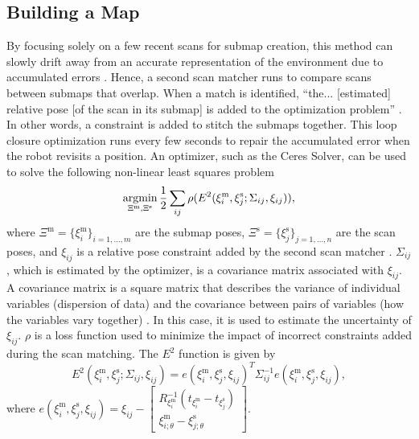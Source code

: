 \subsection{Building a Map} \label{map}
By focusing solely on a few recent scans for submap creation, this method can slowly drift away from an accurate representation of the environment due to accumulated errors \parencite{hessRealtimeLoopClosure2016}. Hence, a second scan matcher runs to compare scans between submaps that overlap. When a match is identified, ``the... [estimated] relative pose [of the scan in its submap] is added to the optimization problem'' \parencite{hessRealtimeLoopClosure2016}. In other words, a constraint is added to stitch the submaps together. This loop closure optimization runs every few seconds to repair the accumulated error when the robot revisits a position. An optimizer, such as the Ceres Solver, can be used to solve the following non-linear least squares problem
\[
    \operatorname*{argmin}_{\Xi^\text{m},\Xi^\text{s}} \frac{1}{2}\sum_{ij}\rho(E^2(\xi_i^\text{m},\xi_j^\text{s};\Sigma_{ij},\xi_{ij})),
\]
where $\Xi^\text{m}=\{\xi_i^\text{m}\}_{i=1,\ldots,m}$ are the submap poses, $\Xi^\text{s}=\{\xi_j^\text{s}\}_{j=1,\ldots,n}$ are the scan poses, and $\xi_{ij}$ is a relative pose constraint added by the second scan matcher \parencite{SolvingNonlinearLeast,hessRealtimeLoopClosure2016}. $\Sigma_{ij}$, which is estimated by the optimizer, is a covariance matrix associated with $\xi_{ij}$. A covariance matrix is a square matrix that describes the variance of individual variables (dispersion of data) and the covariance between pairs of variables (how the variables vary together) \parencite{CovarianceMatrixFormula}. In this case, it is used to estimate the uncertainty of $\xi_{ij}$. $\rho$ is a loss function used to minimize the impact of incorrect constraints added during the scan matching. The $E^2$ function is given by
\[
    E^2(\xi_i^\text{m},\xi_j^\text{s};\Sigma_{ij},\xi_{ij})=e(\xi_i^\text{m},\xi_j^\text{s},\xi_{ij})^T\Sigma_{ij}^{-1}e(\xi_i^\text{m},\xi_j^\text{s},\xi_{ij}),
\]
where $e(\xi_i^\text{m},\xi_j^\text{s},\xi_{ij})=\xi_{ij}-\begin{bmatrix}
        R_{\xi_i^\text{m}}^{-1}(t_{\xi_i^\text{m}}-t_{\xi_j^\text{s}}) \\
        \xi_{i;\theta}^\text{m}-\xi_{j;\theta}^\text{s}
    \end{bmatrix}$.
